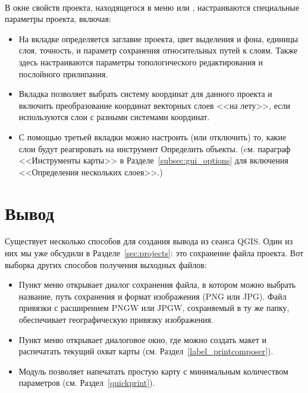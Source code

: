  \\

В окне свойств проекта, находящегося в меню  или , настраиваются специальные параметры
проекта, включая:

\begin{itemize}
\item На вкладке  определяется заглавие проекта, цвет выделения
и фона, единицы слоя, точность, и параметр сохранения относительных путей
к слоям. Также здесь настраиваются параметры топологического редактирования
и послойного прилипания.
\item Вкладка  позволяет выбрать систему координат
для данного проекта и включить преобразование координат векторных слоев
<<на лету>>, если используются слои с разными системами координат.
\item С помощью третьей вкладки  можно настроить
(или отключить) то, какие слои будут реагировать на инструмент Определить
объекты. (cм. параграф <<Инструменты карты>> в Разделе~\ref{subsec:gui_options}
для включения <<Определения нескольких слоев>>.)
\end{itemize}

\section{Вывод}\label{sec:output}

Существует несколько способов для создания вывода из сеанса QGIS. Один из
них мы уже обсудили в Разделе~\ref{sec:projects}: это сохранение файла
проекта. Вот выборка других способов получения выходных файлов:

\begin{itemize}
\item Пункт меню 
открывает диалог сохранения файла, в котором можно выбрать название, путь сохранения
и формат изображения (PNG или JPG). Файл привязки с расширением PNGW
или JPGW, сохраняемый в ту же папку, обеспечивает географическую привязку
изображения.
\item Пункт меню 
открывает диалоговое окно, где можно создать макет и распечатать текущий
охват карты (см. Раздел~\ref{label_printcomposer}).
\item Модуль  позволяет напечатать
простую карту с минимальным количеством параметров (см. Раздел~\ref{quickprint}).
\end{itemize}

